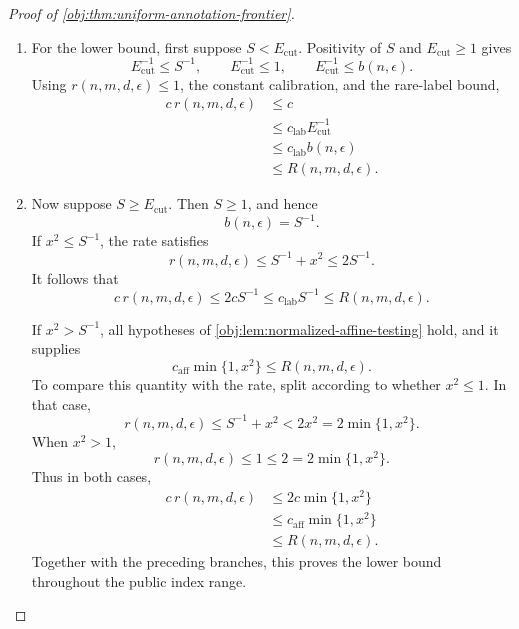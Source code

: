 \documentclass[11pt]{article}
\begin{document}
\begin{proof}[Proof of \cref{obj:thm:uniform-annotation-frontier}]
\begin{enumerate}
The lifted rule \((\mathcal D,U)\mapsto\widehat\tau(\mathcal D,U)\) is Borel measurable by composition with the data projection and takes values in \([-1,1]\). It is therefore admissible in \cref{obj:def:risk}. Squared-error risks are nonnegative, and the defining minimax infimum yields
\[
R(n,m,d,\epsilon)
\le
\sup_{P\in\mathcal M_{d,\epsilon}}
\mathbb E_P[
(\widehat\tau(\mathcal D,U)-\tau(P))^2]
\le C_{\mathrm{up}}r(n,m,d,\epsilon)
\le Cr(n,m,d,\epsilon),
\]
where the last inequality uses \(r(n,m,d,\epsilon)\ge0\).

\item For the lower bound, first suppose \(S<E_{\mathrm{cut}}\). Positivity of \(S\) and \(E_{\mathrm{cut}}\ge1\) gives
\[
E_{\mathrm{cut}}^{-1}\le S^{-1},
\qquad
E_{\mathrm{cut}}^{-1}\le1,
\qquad
E_{\mathrm{cut}}^{-1}
\le b(n,\epsilon).
\]
Using \(r(n,m,d,\epsilon)\le1\), the constant calibration, and the rare-label bound,
\[
\begin{aligned}
c\,r(n,m,d,\epsilon)
&\le c\\
&\le c_{\mathrm{lab}}E_{\mathrm{cut}}^{-1}\\
&\le c_{\mathrm{lab}}b(n,\epsilon)\\
&\le R(n,m,d,\epsilon).
\end{aligned}
\]

\item Now suppose \(S\ge E_{\mathrm{cut}}\). Then \(S\ge1\), and hence
\[
b(n,\epsilon)=S^{-1}.
\]
If \(x^2\le S^{-1}\), the rate satisfies
\[
r(n,m,d,\epsilon)
\le S^{-1}+x^2\le2S^{-1}.
\]
It follows that
\[
c\,r(n,m,d,\epsilon)
\le2cS^{-1}
\le c_{\mathrm{lab}}S^{-1}
\le R(n,m,d,\epsilon).
\]

If \(x^2>S^{-1}\), all hypotheses of \cref{obj:lem:normalized-affine-testing} hold, and it supplies
\[
c_{\mathrm{aff}}\min\{1,x^2\}\le R(n,m,d,\epsilon).
\]
To compare this quantity with the rate, split according to whether \(x^2\le1\). In that case,
\[
r(n,m,d,\epsilon)
\le S^{-1}+x^2
<2x^2
=2\min\{1,x^2\}.
\]
When \(x^2>1\),
\[
r(n,m,d,\epsilon)\le1\le2=2\min\{1,x^2\}.
\]
Thus in both cases,
\[
\begin{aligned}
c\,r(n,m,d,\epsilon)
&\le2c\min\{1,x^2\}\\
&\le c_{\mathrm{aff}}\min\{1,x^2\}\\
&\le R(n,m,d,\epsilon).
\end{aligned}
\]
Together with the preceding branches, this proves the lower bound throughout the public index range.


\end{enumerate}
\end{proof}
\end{document}
